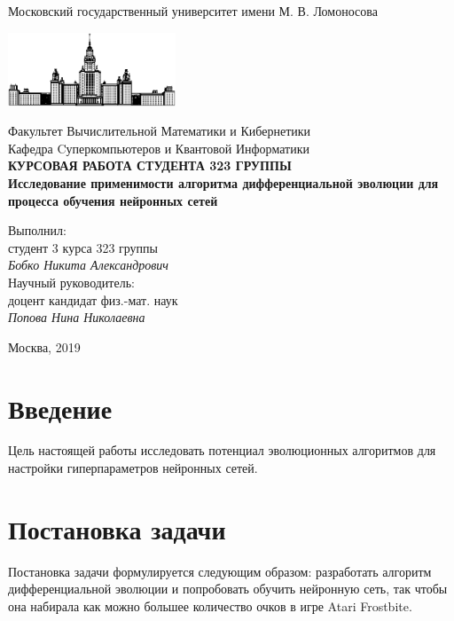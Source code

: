 \documentclass[12pt]{article}
\begin{document}
\begin{titlepage}
\begin{center}
    Московский государственный университет имени М. В. Ломоносова

    \bigskip
    \includegraphics[width=50mm]{msu.eps}

    \bigskip
    Факультет Вычислительной Математики и Кибернетики\\
    Кафедра Cуперкомпьютеров и Квантовой Информатики\\[10mm]

    \textsf{\large\bfseries
        КУРСОВАЯ РАБОТА СТУДЕНТА 323 ГРУППЫ\\[10mm]
        Исследование применимости алгоритма дифференциальной эволюции для процесса обучения нейронных сетей
    }\\[10mm]

    \begin{flushright}
        \parbox{0.5\textwidth}{
            Выполнил:\\
            студент 3 курса 323 группы\\
            \emph{Бобко Никита Александрович}\\[5mm]
            Научный руководитель:\\
            доцент  кандидат физ.-мат. наук\\
            \emph{Попова Нина Николаевна}
        }
    \end{flushright}

    \vspace{\fill}
    Москва, 2019
\end{center}
\end{titlepage}

\newpage
\tableofcontents
\newpage

\section{Введение}

    Цель настоящей работы исследовать потенциал эволюционных алгоритмов для настройки гиперпараметров нейронных сетей. 

\section{Постановка задачи}
    Постановка задачи формулируется следующим образом: разработать алгоритм дифференциальной эволюции и попробовать обучить нейронную сеть, так чтобы она набирала как можно большее количество очков в игре Atari Frostbite.
\end{document}
